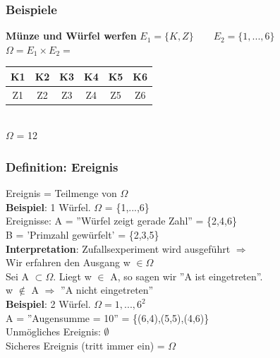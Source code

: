 \subsubsection{Beispiele}
\textbf{Münze und Würfel werfen}
$E_1 = \{K,Z\} \qquad E_2 = \{1,...,6\}$\\
$\Omega = E_1 \times E_2 = $\begin{tabular}{|c|c|c|c|c|c|}
	\hline 
K1	&K2  &K3  &K4  &K5  &K6  \\ 
	\hline 
Z1	& Z2 & Z3 &Z4  &Z5  &Z6  \\ 
	\hline 
\end{tabular} \\
 $\Omega$ = 12
\subsubsection{Definition: Ereignis}
Ereignis = Teilmenge von $\Omega$\\
\textbf{Beispiel}: 1 Würfel. $\Omega$ = \{1,...,6\}\\
Ereignisse: A = ''Würfel zeigt gerade Zahl'' = \{2,4,6\}\\
B = 'Primzahl gewürfelt' = \{2,3,5\}\medskip\\
\textbf{Interpretation}: Zufallsexperiment wird ausgeführt $\Rightarrow$ \\
Wir erfahren den Ausgang w $\in \Omega$\\
Sei A $\subset \Omega$. Liegt w $\in$ A, so sagen wir ''A ist eingetreten''. \\
w $\notin$ A $\Rightarrow$ ''A nicht eingetreten''\medskip\\
\textbf{Beispiel}: 2 Würfel. $\Omega = {1,...,6}^2$\\
A = ''Augensumme  = 10'' = \{(6,4),(5,5),(4,6)\}\medskip\\
Unmögliches Ereignis: $\emptyset$\\
Sicheres Ereignis (tritt immer ein) = $\Omega$\newpage
